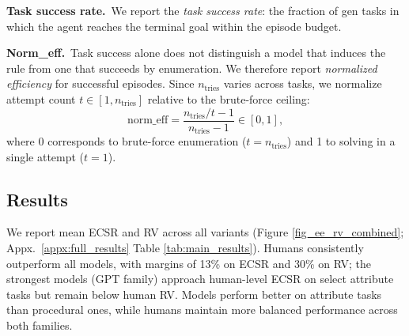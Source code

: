 \documentclass[11pt]{article}
\begin{document}
\noindent\textbf{Task success rate.}~We report the \emph{task success rate}: the fraction of gen tasks in which the agent reaches the terminal goal within the episode budget.


\noindent\textbf{Norm\_eff.}~Task success alone does not distinguish a model that induces the rule from one that succeeds by enumeration. We therefore report \emph{normalized efficiency} for successful episodes. Since $n_\text{tries}$ varies across tasks, we normalize attempt count $t \in [1, n_\text{tries}]$ relative to the brute-force ceiling:
\[
  \text{norm\_eff} = \frac{n_\text{tries}/t - 1}{n_\text{tries} - 1} \in [0,1],
\]
where 0 corresponds to brute-force enumeration ($t {=} n_\text{tries}$) and 1 to solving in a single attempt ($t {=} 1$). 




\subsection{Results}
\label{decoupling}
We report mean ECSR and RV across all variants (Figure \ref{fig_ee_rv_combined}; Appx.~\ref{appx:full_results} Table \ref{tab:main_results}). Humans consistently outperform all models, with margins of 13\% on ECSR and 30\% on RV; the strongest models (GPT family) approach human-level ECSR on select attribute tasks but remain below human RV. Models perform better on attribute tasks than procedural ones, while humans maintain more balanced performance across both families.
\end{document}
